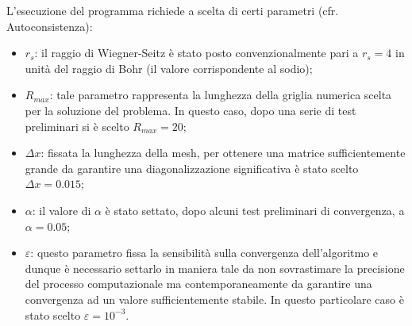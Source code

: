 \documentclass[11pt,a4paper]{article}
\begin{document}
L'esecuzione del programma richiede a scelta di certi parametri (cfr. Autoconsistenza):
\begin{itemize}
\item $r_s$: il raggio di Wiegner-Seitz è stato posto convenzionalmente pari a $r_s=4$ in unità del raggio di Bohr (il valore corrispondente al sodio);
	\item $R_{max}$: tale parametro rappresenta la lunghezza della griglia numerica scelta per la soluzione del problema. In questo caso, dopo una serie di test preliminari si è scelto $R_{max} = 20$;
	\item $\Delta x$: fissata la lunghezza della mesh, per ottenere una matrice sufficientemente grande da garantire una diagonalizzazione significativa è stato scelto $\Delta x = 0.015$;
	\item $\alpha$: il valore di $\alpha$ è stato settato, dopo alcuni test preliminari di convergenza, a $\alpha=0.05$;
	\item $\varepsilon$: questo parametro fissa la sensibilità sulla convergenza dell'algoritmo e dunque è necessario settarlo in maniera tale da non sovrastimare la precisione del processo computazionale ma contemporaneamente da garantire una convergenza ad un valore sufficientemente stabile. In questo particolare caso è stato scelto $\varepsilon = 10^{-3}$. 
\end{itemize}
\end{document}
